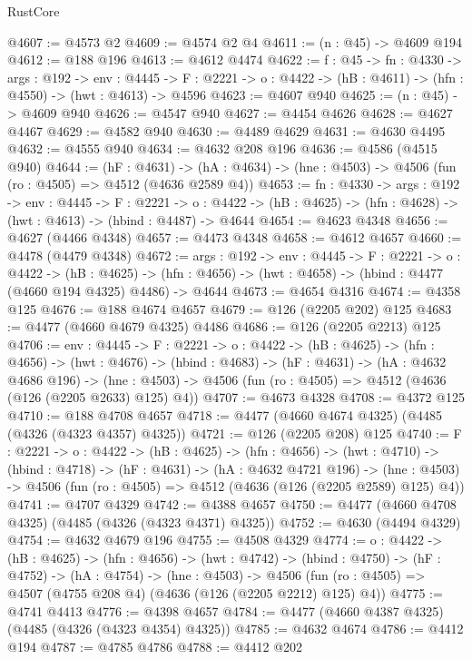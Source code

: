 \begin{lexlean}{RustCore}
\begin{coremodule}
@4607 := @4573 @2
@4609 := @4574 @2 @4
@4611 := (n : @45) -> @4609 @194
@4612 := @188 @196
@4613 := @4612 @4474
@4622 := {f : @45} ->
  {fn : @4330} ->
  {args : @192} ->
  {env : @4445} ->
  {F : @2221} -> {o : @4422} -> (hB : @4611) -> (hfn : @4550) -> (hwt : @4613) -> @4596
@4623 := @4607 @940
@4625 := (n : @45) -> @4609 @940
@4626 := @4547 @940
@4627 := @4454 @4626
@4628 := @4627 @4467
@4629 := @4582 @940
@4630 := @4489 @4629
@4631 := @4630 @4495
@4632 := @4555 @940
@4634 := @4632 @208 @196
@4636 := @4586 (@4515 @940)
@4644 := (hF : @4631) ->
  (hA : @4634) -> (hne : @4503) -> @4506 (fun (ro : @4505) => @4512 (@4636 @2589 @4))
@4653 := {fn : @4330} ->
  {args : @192} ->
  {env : @4445} ->
  {F : @2221} ->
  {o : @4422} -> (hB : @4625) -> (hfn : @4628) -> (hwt : @4613) -> (hbind : @4487) -> @4644
@4654 := @4623 @4348
@4656 := @4627 (@4466 @4348)
@4657 := @4473 @4348
@4658 := @4612 @4657
@4660 := @4478 (@4479 @4348)
@4672 := {args : @192} ->
  {env : @4445} ->
  {F : @2221} ->
  {o : @4422} ->
  (hB : @4625) ->
  (hfn : @4656) -> (hwt : @4658) -> (hbind : @4477 (@4660 @194 @4325) @4486) -> @4644
@4673 := @4654 @4316
@4674 := @4358 @125
@4676 := @188 @4674 @4657
@4679 := @126 (@2205 @202) @125
@4683 := @4477 (@4660 @4679 @4325) @4486
@4686 := @126 (@2205 @2213) @125
@4706 := {env : @4445} ->
  {F : @2221} ->
  {o : @4422} ->
  (hB : @4625) ->
  (hfn : @4656) ->
  (hwt : @4676) ->
  (hbind : @4683) ->
  (hF : @4631) ->
  (hA : @4632 @4686 @196) ->
  (hne : @4503) -> @4506 (fun (ro : @4505) => @4512 (@4636 (@126 (@2205 @2633) @125) @4))
@4707 := @4673 @4328
@4708 := @4372 @125
@4710 := @188 @4708 @4657
@4718 := @4477 (@4660 @4674 @4325) (@4485 (@4326 (@4323 @4357) @4325))
@4721 := @126 (@2205 @208) @125
@4740 := {F : @2221} ->
  {o : @4422} ->
  (hB : @4625) ->
  (hfn : @4656) ->
  (hwt : @4710) ->
  (hbind : @4718) ->
  (hF : @4631) ->
  (hA : @4632 @4721 @196) ->
  (hne : @4503) -> @4506 (fun (ro : @4505) => @4512 (@4636 (@126 (@2205 @2589) @125) @4))
@4741 := @4707 @4329
@4742 := @4388 @4657
@4750 := @4477 (@4660 @4708 @4325) (@4485 (@4326 (@4323 @4371) @4325))
@4752 := @4630 (@4494 @4329)
@4754 := @4632 @4679 @196
@4755 := @4508 @4329
@4774 := {o : @4422} ->
  (hB : @4625) ->
  (hfn : @4656) ->
  (hwt : @4742) ->
  (hbind : @4750) ->
  (hF : @4752) ->
  (hA : @4754) ->
  (hne : @4503) ->
  @4506 (fun (ro : @4505) => @4507 (@4755 @208 @4) (@4636 (@126 (@2205 @2212) @125) @4))
@4775 := @4741 @4413
@4776 := @4398 @4657
@4784 := @4477 (@4660 @4387 @4325) (@4485 (@4326 (@4323 @4354) @4325))
@4785 := @4632 @4674
@4786 := @4412 @194
@4787 := @4785 @4786
@4788 := @4412 @202

\end{coremodule}
\end{lexlean}
